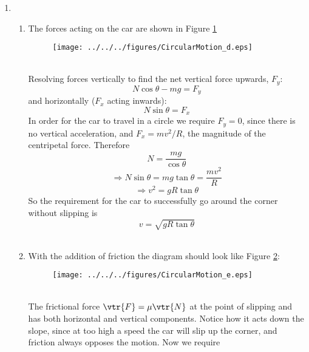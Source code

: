 \begin{problem}
{\begin{enumerate}
\begin{equation*}
\Rightarrow v^2=\mu gR
\end{equation*} therefore
\begin{equation*}
v\le\sqrt{\mu gR}
\end{equation*}
for the car not to slip. 
\\
\item
\begin{enumerate}
\item The forces acting on the car are shown in Figure \ref{fig:CircularMotion_d}
\begin{figure}[h]
\centering
\texttt{[image: ../../../figures/CircularMotion\_d.eps]}
\caption{}
\label{fig:CircularMotion_d}
\end{figure}
\\
Resolving forces vertically to find the net vertical force upwards, $F_y$:
\begin{equation*} N\cos\theta-mg=F_y \end{equation*}
and horizontally ($F_x$ acting inwards):
\begin{equation*} N\sin\theta=F_x \end{equation*}
In order for the car to travel in a circle we require $F_y=0$, since there is no vertical acceleration, and $F_x=mv^2/R$, the magnitude of the centripetal force. Therefore
\begin{equation*} N=\frac{mg}{\cos\theta} \end{equation*}
\begin{equation*} \Rightarrow N\sin\theta=mg\tan\theta=\frac{mv^2}{R} \end{equation*}
\begin{equation*} \Rightarrow v^2=gR\tan\theta \end{equation*}
So the requirement for the car to successfully go around the corner without slipping is 
\begin{equation*}
v=\sqrt{gR\tan\theta}
\end{equation*}
\\
\item With the addition of friction the diagram should look like Figure \ref{fig:CircularMotion_e}:
\begin{figure}[h]
\centering
\texttt{[image: ../../../figures/CircularMotion\_e.eps]}
\caption{}
\label{fig:CircularMotion_e}
\end{figure}
\\
The frictional force $\vtr{F}=\mu \vtr{N}$ at the point of slipping and has both horizontal and vertical components. Notice how it acts down the slope, since at too high a speed the car will slip up the corner, and friction always opposes the motion. Now we require

\end{enumerate}
\end{enumerate}}
\end{problem}
